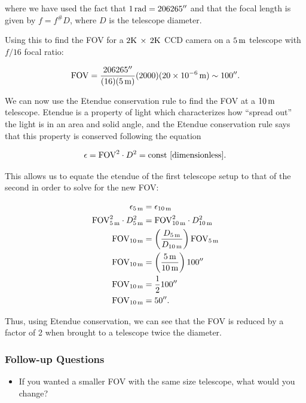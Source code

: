 \documentclass[a4paper,10pt]{article}
\begin{document}
{\noindent}where we have used the fact that $1\,{\rm rad}=206265''$ and that the focal length is given by $f=f^{\#}D$, where $D$ is the telescope diameter.

{\noindent}Using this to find the FOV for a $2{\rm K}\,\times\,2{\rm K}$ CCD camera on a $5\,{\rm m}$ telescope with $f/16$ focal ratio:

\begin{align*}
    {\rm FOV} = \frac{206265''}{(16)(5\,{\rm m})} (2000)(20\times10^{-6}\,{\rm m}) \sim 100''.
\end{align*}

{\noindent}We can now use the Etendue conservation rule to find the FOV at a $10\,{\rm m}$ telescope. Etendue is a property of light which characterizes how ``spread out'' the light is in an area and solid angle, and the Etendue conservation rule says that this property is conserved following the equation

\begin{align*}
    \epsilon = {\rm FOV}^2 \cdot D^2 = {\rm const} ~ [{\rm dimensionless}].
\end{align*}

{\noindent}This allows us to equate the etendue of the first telescope setup to that of the second in order to solve for the new FOV:

\begin{align*}
    \epsilon_{5\,{\rm m}} &= \epsilon_{10\,{\rm m}} \\
    {\rm FOV}_{5\,{\rm m}}^2 \cdot D_{5\,{\rm m}}^2 &= {\rm FOV}_{10\,{\rm m}}^2 \cdot D_{10\,{\rm m}}^2 \\
    {\rm FOV}_{10\,{\rm m}} &= \left(\frac{D_{5\,{\rm m}}}{D_{10\,{\rm m}}}\right) {\rm FOV}_{5\,{\rm m}} \\
    {\rm FOV}_{10\,{\rm m}} &= \left(\frac{5\,{\rm m}}{10\,{\rm m}}\right) 100'' \\
    {\rm FOV}_{10\,{\rm m}} &= \frac{1}{2} 100'' \\
    {\rm FOV}_{10\,{\rm m}} &= 50''.
\end{align*}

{\noindent}Thus, using Etendue conservation, we can see that the FOV is reduced by a factor of 2 when brought to a telescope twice the diameter.

\subsubsection{Follow-up Questions}

\begin{itemize}
    \item If you wanted a smaller FOV with the same size telescope, what would you change?
\end{itemize}
\end{document}
